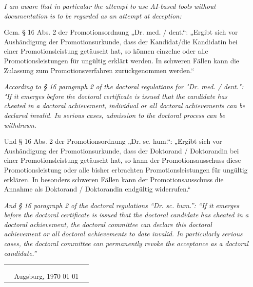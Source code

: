 \emph{\small\color{dkfzgray2} I am aware that in particular the attempt to use AI-based tools without documentation is to be regarded as an attempt at deception:}

Gem. § 16 Abs. 2 der Promotionsordnung „Dr. med. / dent.“:
„Ergibt sich vor Aushändigung der Promotionsurkunde, dass der Kandidat/die Kandidatin bei einer Promotionsleistung getäuscht hat, so können einzelne oder alle Promotionsleistungen für ungültig erklärt werden. In schweren Fällen kann die Zulassung zum Promotionsverfahren zurückgenommen werden.“

\emph{\small\color{dkfzgray2} According to § 16 paragraph 2 of the doctoral regulations for "Dr. med. / dent.":
"If it emerges before the doctoral certificate is issued that the candidate has cheated in a doctoral achievement, individual or all doctoral achievements can be declared invalid. In serious cases, admission to the doctoral process can be withdrawn.}

Und § 16 Abs. 2 der Promotionsordnung „Dr. sc. hum.“:
„Ergibt sich vor Aushändigung der Promotionsurkunde, dass der Doktorand / Doktorandin bei einer Promotionsleistung getäuscht hat, so kann der Promotionsausschuss diese Promotionsleistung oder alle bisher erbrachten Promotionsleistungen für ungültig erklären. In besonders schweren Fällen kann der Promotionsausschuss die Annahme als Doktorand / Doktorandin endgültig widerrufen.“

\emph{\small\color{dkfzgray2} And § 16 paragraph 2 of the doctoral regulations “Dr. sc. hum.”:
“If it emerges before the doctoral certificate is issued that the doctoral candidate has cheated in a doctoral achievement, the doctoral committee can declare this doctoral achievement or all doctoral achievements to date invalid. In particularly serious cases, the doctoral committee can permanently revoke the acceptance as a doctoral candidate.”}

\begin{tabular}{p{3cm}p{5cm}p{4cm}}
      &  & \\
      & & \\
      &Augsburg, \today & \hrulefill\\
\end{tabular}
